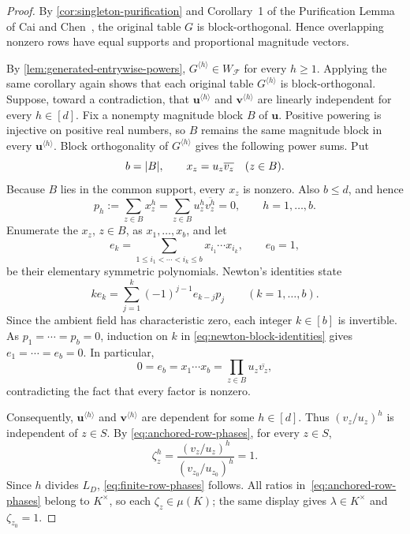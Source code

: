 \documentclass[11pt]{article}
\theoremstyle{plain}
\theoremstyle{definition}
\theoremstyle{remark}
\newcommand{\cF}{\mathcal F}
\newcommand{\Pow}[2]{#1^{\langle #2\rangle}}
\DeclarePairedDelimiter{\abs}{\lvert}{\rvert}
\begin{document}
\begin{proof}
By \cref{cor:singleton-purification} and Corollary~1 of the Purification Lemma
of Cai and Chen~\cite[Lemma~7 and Corollary~1]{CaiChen2017}, the original
table $G$ is block-orthogonal.
Hence overlapping nonzero rows have equal
supports and proportional magnitude vectors.

By \cref{lem:generated-entrywise-powers}, $\Pow{G}{h}\in W_{\cF}$ for every
$h\ge1$.  Applying the same corollary again shows that each original table
$\Pow{G}{h}$ is block-orthogonal.  Suppose, toward a contradiction,
that $\Pow{\mathbf u}{h}$ and $\Pow{\mathbf v}{h}$ are linearly independent
for every $h\in[d]$.  Fix a nonempty magnitude block $B$ of $\mathbf u$.
Positive powering is injective on positive real numbers, so $B$ remains the
same magnitude block in every $\Pow{\mathbf u}{h}$.  Block orthogonality of
$\Pow{G}{h}$ gives the following power sums.  Put
\[
  b=\abs B,
  \qquad
  x_z=u_z\overline{v_z}\quad(z\in B).
\]
Because $B$ lies in the common support, every $x_z$ is nonzero.  Also
$b\le d$, and hence
\begin{equation*}
  p_h:=\sum_{z\in B}x_z^h
  =\sum_{z\in B}u_z^h\overline{v_z^h}=0,
  \qquad h=1,\ldots,b.
\end{equation*}
Enumerate the $x_z$, $z\in B$, as $x_1,\ldots,x_b$, and let
\[
  e_k=\sum_{1\le i_1<\cdots<i_k\le b}
       x_{i_1}\cdots x_{i_k},
  \qquad e_0=1,
\]
be their elementary symmetric polynomials.  Newton's identities state
\begin{equation}
  k e_k
  =\sum_{j=1}^k(-1)^{j-1}e_{k-j}p_j
  \qquad(k=1,\ldots,b).
  \label{eq:newton-block-identities}
\end{equation}
Since the ambient field has characteristic zero, each integer
$k\in[b]$ is invertible.  As $p_1=\cdots=p_b=0$, induction on $k$ in
\eqref{eq:newton-block-identities} gives
$e_1=\cdots=e_b=0$.  In particular,
\[
  0=e_b=x_1\cdots x_b
  =\prod_{z\in B}u_z\overline{v_z},
\]
contradicting the fact that every factor is nonzero.

Consequently, $\Pow{\mathbf u}{h}$ and $\Pow{\mathbf v}{h}$ are dependent
for some $h\in[d]$.  Thus $(v_z/u_z)^h$ is independent of $z\in S$.  By
\eqref{eq:anchored-row-phases}, for every $z\in S$,
\[
  \zeta_z^h
  =\frac{(v_z/u_z)^h}{(v_{z_0}/u_{z_0})^h}=1.
\]
Since $h$ divides $L_D$, \eqref{eq:finite-row-phases} follows.  All ratios
in~\eqref{eq:anchored-row-phases} belong to $K^\times$, so each
$\zeta_z\in\mu(K)$; the same display gives
$\lambda\in K^\times$ and $\zeta_{z_0}=1$.
\end{proof}
\end{document}
